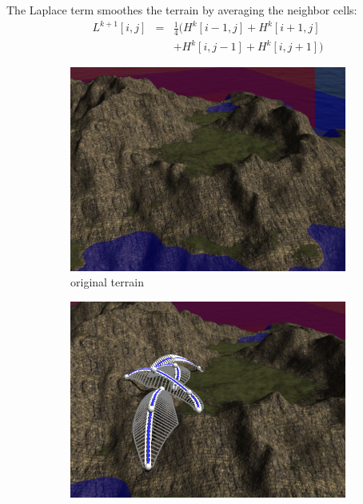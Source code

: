 \documentclass[journal, letterpaper]{IEEEtran}
\begin{document}
The Laplace term smoothes the terrain by averaging the neighbor cells:
\begin{equation}
\begin{array}{rcl}
	L^{k+1}[i,j] &=& \frac{1}{4}(H^k[i-1,j]+H^k[i+1,j] \\
							 & & +H^k[i,j-1]+H^k[i,j+1])
\end{array}
\label{eq:Diffusion4}
\end{equation}

\begin{figure}
	\centering
	\begin{subfigure}[b]{0.3\textwidth}
		\includegraphics[width=\textwidth]{images/diffusionEditExisting1}
		\caption{original terrain}
		\label{fig:featsExist1}
	\end{subfigure}
	\begin{subfigure}[b]{0.3\textwidth}
		\includegraphics[width=\textwidth]{images/diffusionEditExisting2}

\end{subfigure}
\end{figure}
\end{document}
